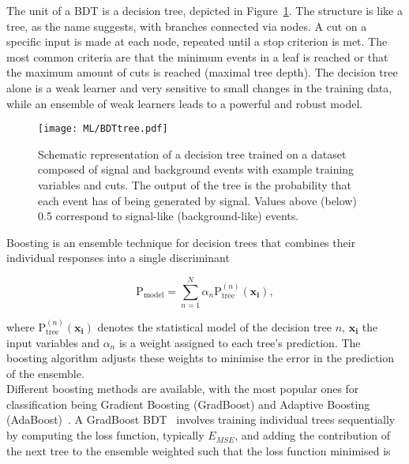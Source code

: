 The unit of a BDT is a decision tree, depicted in Figure~\ref{ML:BDT}. The structure is like a tree, as the name suggests, with branches connected via nodes. A cut on a specific input is made at each node, repeated until a stop criterion is met. The most common criteria are that the minimum events in a leaf is reached or that the maximum amount of cuts is reached (maximal tree depth). The decision tree alone is a weak learner and very sensitive to small changes in the training data, while an ensemble of weak learners leads to a powerful and robust model.\\


\begin{figure}[htbp]
    \RawFloats
    \begin{center}
    \texttt{[image: ML/BDTtree.pdf]}
    \caption{
        Schematic representation of a decision tree trained on a dataset composed of signal and background events with example training variables and cuts. The output of the tree is the probability that each event has of being generated by signal. Values above (below) 0.5 correspond to signal-like (background-like) events.
    }
    \label{ML:BDT}
    \end{center}
\end{figure}

Boosting is an ensemble technique for decision trees that combines their individual responses into a single discriminant

\begin{equation}
    \text{P}_{\text{model}} = \sum_{n=1}^N \alpha_n \text{P}_{\text{tree}}^{(n)}(\mathbf{x_i}),
\end{equation}

where $\text{P}_{\text{tree}}^{(n)}(\mathbf{x_i})$ denotes the statistical model of the decision tree $n$, $\mathbf{x_i}$ the input variables and $\alpha_n$ is a weight assigned to each tree's prediction. The boosting algorithm adjusts these weights to minimise the error in the prediction of the ensemble.\\

Different boosting methods are available, with the most popular ones for classification being Gradient Boosting (GradBoost) and Adaptive Boosting (AdaBoost)~\cite{FREUND1997119}. A GradBoost BDT~\cite{Chen_2016} involves training individual trees sequentially by computing the loss function, typically $E_{MSE}$, and adding the contribution of the next tree to the ensemble weighted such that the loss function minimised is

